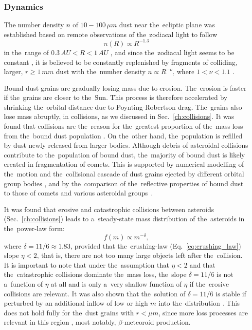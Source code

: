\subsubsection{Dynamics}

The number density $n$ of $10 - 100 \, \si{\mu m}$ dust near the~ecliptic plane was established based on remote observations of the~zodiacal light to follow 
\begin{equation}
    n(R) \propto R^{-1.3} \label{eq:dust_number_density}
\end{equation}
in the~range of $0.3 \, \si{AU} < R < 1 \, \si{AU}$ \citep{leinert1981zodiacal}, and since the~zodiacal light seems to be constant \citep{buffington2016measurements}, it is believed to be constantly replenished by fragments of colliding, larger, $r \geq 1 \, \si{mm}$ dust with the~number density $n \propto R^{-\nu}$, where $1 < \nu < 1.1$ \citep{leinert1983maintain}.

Bound dust grains are gradually losing mass due to erosion. The~erosion is faster if the~grains are closer to the~Sun. This process is therefore accelerated by shrinking the~orbital distance due to Poynting-Robertson drag. The~grains also lose mass abruptly, in collisions, as we discussed in Sec.~\ref{ch:collisions}. It was found that collisions are the~reason for the~greatest proportion of the~mass loss from the~bound dust population \citep{grun1985collisional}. On the~other hand, the~population is refilled by dust newly released from larger bodies. Although debris of asteroidal collisions contribute to the~population of bound dust, the~majority of bound dust is likely created in fragmentation of comets. This is supported by numerical modelling of the~motion and the~collisional cascade of dust grains ejected by different orbital group bodies \citep{nesvorny2010cometary}, and by the~comparison of the~reflective properties of bound dust to those of comets and various asteroidal groups \citep{yang2015origin}. 

It was found \citep{dohnanyi1969collisional} that erosive and catastrophic collisions between asteroids (Sec.~\ref{ch:collisions}) leads to a~steady-state mass distribution of the~asteroids in the~power-law form: 
\begin{equation}
    f(m) \propto m^{-\delta}, \label{eq:mass_distribution}
\end{equation}
where $\delta = 11/6 \approx 1.83$, provided that the~crushing-law (Eq.~\ref{eq:crushing_law}) slope $\eta < 2$, that is, there are not too many large objects left after the~collision. It is important to note that under the~assumption that $\eta < 2$ and that the~catastrophic collisions dominate the~mass loss, the~slope $\delta = 11/6$ is not a~function of $\eta$ at all and is only a~very shallow function of $\eta$ if the~erosive collisions are relevant. It was also shown that the~solution of $\delta = 11/6$ is stable if perturbed by an additional inflow of low or high $m$ into the~distribution \citep{dohnanyi1969collisional}. This does not hold fully for the~dust grains with $r < \si{\mu m}$, since more loss processes are relevant in this region \citep{grun1985collisional}, most notably, $\beta$-meteoroid production.

